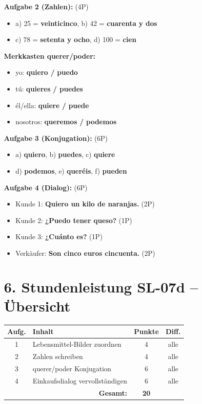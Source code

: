 \documentclass[11pt, a4paper]{article}
\newcommand{\sequenz}{07}
\newcommand{\block}{d}
\newcommand{\loesung}[1]{\textcolor{loesung}{\textbf{#1}}}
\begin{document}
\textbf{Aufgabe 2 (Zahlen):} (4P)
\begin{itemize}
    \item a) 25 = \loesung{veinticinco}, b) 42 = \loesung{cuarenta y dos}
    \item c) 78 = \loesung{setenta y ocho}, d) 100 = \loesung{cien}
\end{itemize}

\textbf{Merkkasten querer/poder:}
\begin{itemize}
    \item yo: \loesung{quiero / puedo}
    \item tú: \loesung{quieres / puedes}
    \item él/ella: \loesung{quiere / puede}
    \item nosotros: \loesung{queremos / podemos}
\end{itemize}

\textbf{Aufgabe 3 (Konjugation):} (6P)
\begin{itemize}
    \item a) \loesung{quiero}, b) \loesung{puedes}, c) \loesung{quiere}
    \item d) \loesung{podemos}, e) \loesung{queréis}, f) \loesung{pueden}
\end{itemize}

\textbf{Aufgabe 4 (Dialog):} (6P)
\begin{itemize}
    \item Kunde 1: \loesung{Quiero un kilo de naranjas.} (2P)
    \item Kunde 2: \loesung{¿Puedo tener queso?} (1P)
    \item Kunde 3: \loesung{¿Cuánto es?} (1P)
    \item Verkäufer: \loesung{Son cinco euros cincuenta.} (2P)
\end{itemize}

\section*{6. Stundenleistung SL-\sequenz\block{} -- Übersicht}

\begin{tabular}{|c|l|c|c|}
\hline
\textbf{Aufg.} & \textbf{Inhalt} & \textbf{Punkte} & \textbf{Diff.} \\
\hline
1 & Lebensmittel-Bilder zuordnen & 4 & alle \\
\hline
2 & Zahlen schreiben & 4 & alle \\
\hline
3 & querer/poder Konjugation & 6 & alle \\
\hline
4 & Einkaufsdialog vervollständigen & 6 & alle \\
\hline
\multicolumn{2}{|r|}{\textbf{Gesamt:}} & \textbf{20} & \\
\hline
\end{tabular}
\end{document}
